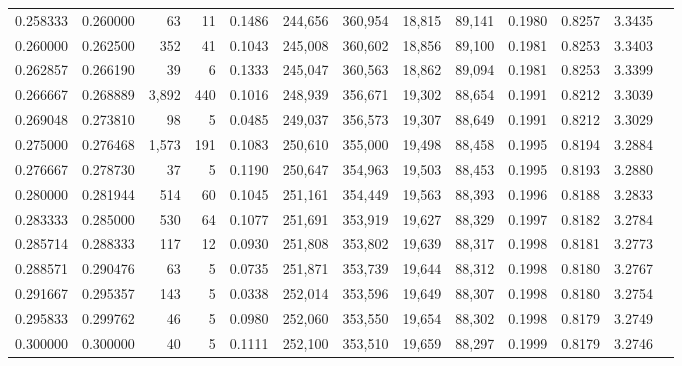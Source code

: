 \begin{tabular}{rrrrrrrrrrrrr}
0.258333 & 0.260000 &     63 &     11 &                                     0.1486 & 244,656 & 360,954 &  18,815 &  89,141 & 0.1980 & 0.8257 & 3.3435 \\
0.260000 & 0.262500 &    352 &     41 &                                     0.1043 & 245,008 & 360,602 &  18,856 &  89,100 & 0.1981 & 0.8253 & 3.3403 \\
0.262857 & 0.266190 &     39 &      6 &                                     0.1333 & 245,047 & 360,563 &  18,862 &  89,094 & 0.1981 & 0.8253 & 3.3399 \\
0.266667 & 0.268889 &  3,892 &    440 &                                     0.1016 & 248,939 & 356,671 &  19,302 &  88,654 & 0.1991 & 0.8212 & 3.3039 \\
0.269048 & 0.273810 &     98 &      5 &                                     0.0485 & 249,037 & 356,573 &  19,307 &  88,649 & 0.1991 & 0.8212 & 3.3029 \\
0.275000 & 0.276468 &  1,573 &    191 &                                     0.1083 & 250,610 & 355,000 &  19,498 &  88,458 & 0.1995 & 0.8194 & 3.2884 \\
0.276667 & 0.278730 &     37 &      5 &                                     0.1190 & 250,647 & 354,963 &  19,503 &  88,453 & 0.1995 & 0.8193 & 3.2880 \\
0.280000 & 0.281944 &    514 &     60 &                                     0.1045 & 251,161 & 354,449 &  19,563 &  88,393 & 0.1996 & 0.8188 & 3.2833 \\
0.283333 & 0.285000 &    530 &     64 &                                     0.1077 & 251,691 & 353,919 &  19,627 &  88,329 & 0.1997 & 0.8182 & 3.2784 \\
0.285714 & 0.288333 &    117 &     12 &                                     0.0930 & 251,808 & 353,802 &  19,639 &  88,317 & 0.1998 & 0.8181 & 3.2773 \\
0.288571 & 0.290476 &     63 &      5 &                                     0.0735 & 251,871 & 353,739 &  19,644 &  88,312 & 0.1998 & 0.8180 & 3.2767 \\
0.291667 & 0.295357 &    143 &      5 &                                     0.0338 & 252,014 & 353,596 &  19,649 &  88,307 & 0.1998 & 0.8180 & 3.2754 \\
0.295833 & 0.299762 &     46 &      5 &                                     0.0980 & 252,060 & 353,550 &  19,654 &  88,302 & 0.1998 & 0.8179 & 3.2749 \\
0.300000 & 0.300000 &     40 &      5 &                                     0.1111 & 252,100 & 353,510 &  19,659 &  88,297 & 0.1999 & 0.8179 & 3.2746 \\

\end{tabular}
